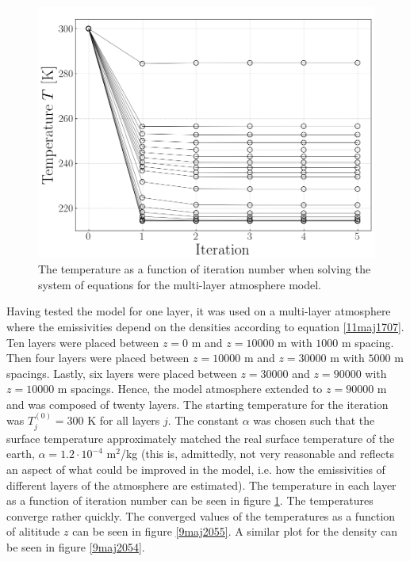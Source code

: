 \documentclass[twocolumn]{article}
\begin{document}
\begin{large}
\begin{figure}[!t]
\begin{center}
        \includegraphics[scale=0.35]{Iteration.png}
    \end{center}
    \caption{The temperature as a function of iteration number when solving the system of equations for the multi-layer atmosphere model.}
    \label{9maj2056}
\end{figure}

Having tested the model for one layer, it was used on a multi-layer atmosphere where the emissivities depend on the densities according to equation \eqref{11maj1707}. Ten layers were placed between $z=0$ m and $z=10000$ m with $1000$ m spacing. Then four layers were placed between $z=10000$ m and $z=30000$ m with $5000$ m spacings. Lastly, six layers were placed between $z=30000$ and $z=90000$ with $z=10000$ m spacings. Hence, the model atmosphere extended to $z=90000$ m and was composed of twenty layers. The starting temperature for the iteration was $T_j^{(0)}=300$ K for all layers $j$. The constant $\alpha$ was chosen such that the surface temperature approximately matched the real surface temperature of the earth, $\alpha=1.2\cdot 10^{-4}$ m$^{2}$/kg (this is, admittedly, not very reasonable and reflects an aspect of what could be improved in the model, i.e. how the emissivities of different layers of the atmosphere are estimated). The temperature in each layer as a function of iteration number can be seen in figure \ref{9maj2056}. The temperatures converge rather quickly. The converged values of the temperatures as a function of alititude $z$ can be seen in figure \ref{9maj2055}. A similar plot for the density can be seen in figure \ref{9maj2054}. 


\end{large}
\end{document}

